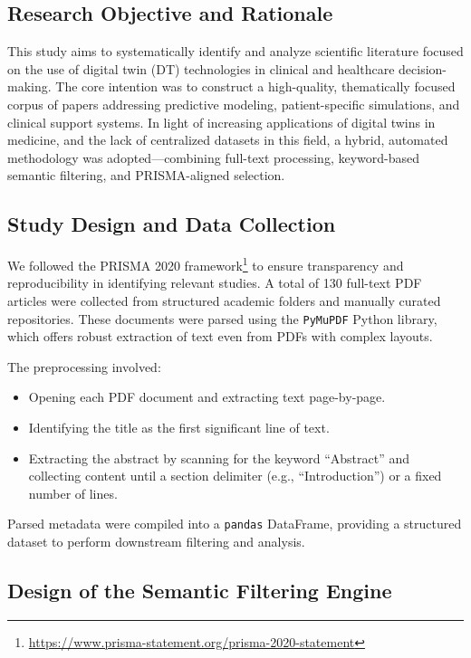\documentclass[10pt,a4paper]{article}
\begin{document}
\subsection*{Research Objective and Rationale}

This study aims to systematically identify and analyze scientific literature focused on the use of digital twin (DT) technologies in clinical and healthcare decision-making. The core intention was to construct a high-quality, thematically focused corpus of papers addressing predictive modeling, patient-specific simulations, and clinical support systems. In light of increasing applications of digital twins in medicine, and the lack of centralized datasets in this field, a hybrid, automated methodology was adopted—combining full-text processing, keyword-based semantic filtering, and PRISMA-aligned selection.

\subsection*{Study Design and Data Collection}

We followed the PRISMA 2020 framework\footnote{\url{https://www.prisma-statement.org/prisma-2020-statement}} to ensure transparency and reproducibility in identifying relevant studies. A total of 130 full-text PDF articles were collected from structured academic folders and manually curated repositories. These documents were parsed using the \texttt{PyMuPDF} Python library, which offers robust extraction of text even from PDFs with complex layouts.

The preprocessing involved:
\begin{itemize}
    \item Opening each PDF document and extracting text page-by-page.
    \item Identifying the title as the first significant line of text.
    \item Extracting the abstract by scanning for the keyword ``Abstract'' and collecting content until a section delimiter (e.g., ``Introduction'') or a fixed number of lines.
\end{itemize}

Parsed metadata were compiled into a \texttt{pandas} DataFrame, providing a structured dataset to perform downstream filtering and analysis.

\subsection*{Design of the Semantic Filtering Engine}
\end{document}
